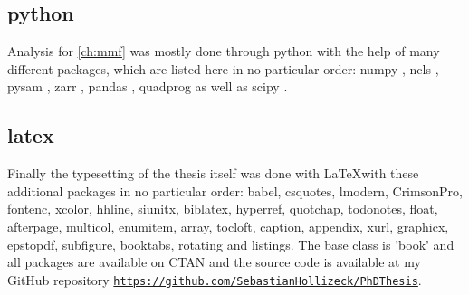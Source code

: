 {\subsection*{python}
Analysis for \autoref{ch:mmf} was mostly done through python \cite{VanRossum2010} with the help of many different packages, which are listed here in no particular order: numpy \cite{Harris2020}, ncls \cite{Stovner2019}, pysam \cite{Heger2021,Bonfield2021,Danecek2021}, zarr \cite{Miles2021}, pandas \cite{McKinney2010,Reback2021}, quadprog \cite{McGibbon2021} as well as scipy \cite{Virtanen2020}.

\subsection*{latex}
Finally the typesetting of the thesis itself was done with \LaTeX with these additional packages in no particular order: babel, csquotes, lmodern, CrimsonPro, fontenc, xcolor, hhline, siunitx, biblatex, hyperref, quotchap, todonotes, float, afterpage, multicol, enumitem, array, tocloft, caption, appendix, xurl, graphicx, epstopdf, subfigure, booktabs, rotating and listings. 
The base class is 'book' and all packages are available on CTAN and the source code is available at my GitHub repository \href{https://github.com/SebastianHollizeck/PhDThesis}{\nolinkurl{https://github.com/SebastianHollizeck/PhDThesis}}.

}

